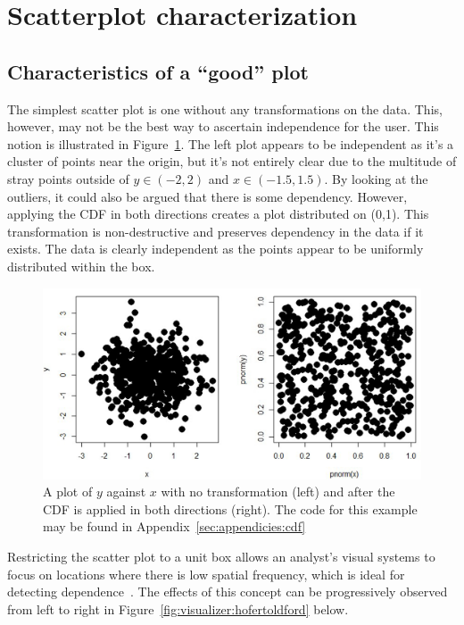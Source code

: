 \section{Scatterplot characterization}
\label{sec:visualizer:scatterplot}

\subsection{Characteristics of a ``good'' plot}
\label{sec:visualizer:scatterplot:goodplot}

The simplest scatter plot is one without any transformations on the data. This,
however, may not be the best way to ascertain independence for the user. This
notion is illustrated in Figure~\ref{fig:visualizer:cdf}. The left plot appears
to be independent as it's a cluster of points near the origin, but it's not
entirely clear due to the multitude of stray points outside of $y\in (-2,2)$ 
and $x\in(-1.5,1.5)$. By looking at the outliers, it could also be argued that 
there is some dependency. However, applying the CDF in both directions creates 
a plot distributed on (0,1). This transformation is non-destructive and 
preserves dependency in the data if it exists. The data is clearly independent 
as the points appear to be uniformly distributed within the box.

\begin{figure}[htb]
	\begin{center}
		\includegraphics[width=0.75\linewidth]{ch-visualizer/figures/cdf}
		\caption[A plot of $y$ against $x$ after the CDF is applied in both
		directions.]{A plot of $y$ against $x$ with no transformation (left) 
		and after
			the CDF is applied in both directions (right). The code for this 
			example may be
			found in Appendix~\ref{sec:appendicies:cdf}}
		\label{fig:visualizer:cdf}
	\end{center}
\end{figure}

Restricting the scatter plot to a unit box allows an analyst's visual systems 
to 
focus on locations where there is low spatial frequency, which is ideal for 
detecting dependence~\cite{hofert2016}. The effects of this concept can be 
progressively observed from left to right in 
Figure~\ref{fig:visualizer:hofertoldford} below.

